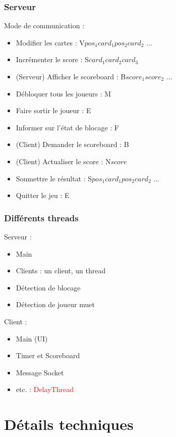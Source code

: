 \documentclass[12pt]{beamer}
\newcommand{\class}[1]{\colorbox{bg}{\textcolor{red}{\usefont{OT1}{cmtt}{m}{n}#1}}}
\begin{document}
\begin{frame}
\frametitle{Serveur}
Mode de communication :
\begin{itemize}
\item Modifier les cartes : V{\textvisiblespace}$pos_1${\textvisiblespace}$card_1${\textvisiblespace}$pos_2${\textvisiblespace}$card_2$ ...
\item Incrémenter le score : S{\textvisiblespace}$card_1${\textvisiblespace}$card_2${\textvisiblespace}$card_3$
\item (Serveur) Afficher le scoreboard : B{\textvisiblespace}$score_1${\textvisiblespace}$score_2$ ...
\item Débloquer tous les joueurs : M
\item Faire sortir le joueur : E
\item Informer sur l'état de blocage : F
\item (Client) Demander le scoreboard : B
\item (Client) Actualiser le score : N{\textvisiblespace}$score$
\item Soumettre le résultat : S{\textvisiblespace}$pos_1${\textvisiblespace}$card_1${\textvisiblespace}$pos_2${\textvisiblespace}$card_2$ ...
\item Quitter le jeu : E
\end{itemize}
\end{frame}

\begin{frame}
\frametitle{Différents threads}
Serveur :
\begin{itemize}
\item Main
\item Clients : un client, un thread
\item Détection de blocage
\item Détection de joueur muet
\end{itemize}

Client :
\begin{itemize}
\item Main (UI) 
\item Timer et Scoreboard
\item Message Socket
\item etc. : \class{DelayThread}
\end{itemize}
\end{frame}

\section{Détails techniques}
\begin{frame}
\tableofcontents[currentsection]
\end{frame}    
\end{document}
